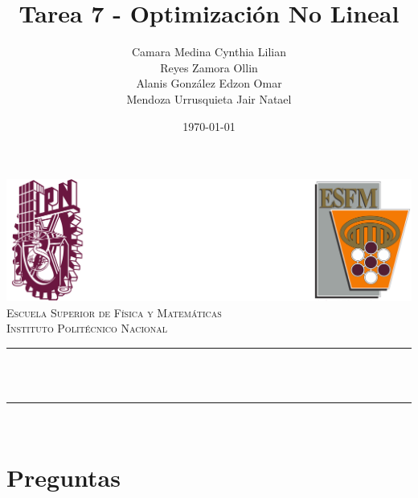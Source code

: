 \documentclass[12pt]{article}
\title{Tarea 7 - Optimización No Lineal}
\author{Camara Medina Cynthia Lilian \\
Reyes Zamora Ollin \\
Alanis González Edzon Omar \\[0.2cm]
Mendoza Urrusquieta Jair Natael}
\date{\today}
\makeatletter
\let\thetitle\@title
\let\theauthor\@author
\let\thedate\@date
\makeatother
\begin{document}
\begin{titlepage}
\centering
\includegraphics[width=0.9\linewidth]{../logo.png}\\[2.0 cm]
\textsc{\LARGE Escuela Superior de Física y Matemáticas}\\[1.2 cm]
\textsc{\Large Instituto Politécnico Nacional}\\[2.5 cm]
\rule{\linewidth}{0.2 mm} \\[0.4 cm]
{\huge \bfseries \thetitle}\\
\rule{\linewidth}{0.2 mm} \\[2.5 cm]
\textsc{\large \theauthor}
\vfill
{\large \thedate}
\end{titlepage}

\section*{Preguntas}
\end{document}
